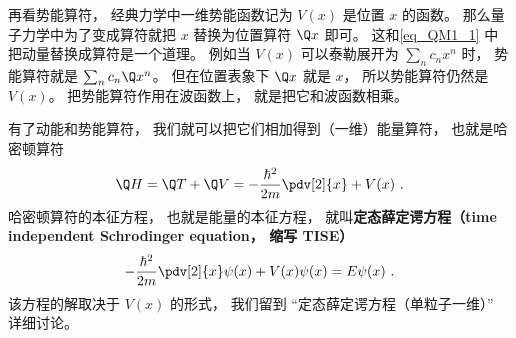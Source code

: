 再看势能算符， 经典力学中一维势能函数记为 $V(x)$ 是位置 $x$ 的函数。 那么量子力学中为了变成算符就把 $x$ 替换为位置算符 $\Q x$ 即可。 这和\autoref{eq_QM1_1} 中把动量替换成算符是一个道理。 例如当 $V(x)$ 可以泰勒展开为 $\sum_n c_n x^n$ 时， 势能算符就是 $\sum_n c_n \Q x^n$。 但在位置表象下 $\Q x$ 就是 $x$， 所以势能算符仍然是 $V(x)$。 把势能算符作用在波函数上， 就是把它和波函数相乘。

有了动能和势能算符， 我们就可以把它们相加得到（一维）能量算符， 也就是哈密顿算符
\begin{equation}
\Q H = \Q T + \Q V = -\frac{\hbar^2}{2m} \pdv[2]{x} + V(x)~.
\end{equation}
哈密顿算符的本征方程， 也就是能量的本征方程， 就叫\textbf{定态薛定谔方程（time independent Schrodinger equation， 缩写 TISE）}
\begin{equation}
-\frac{\hbar^2}{2m} \pdv[2]{x}\psi(x) + V(x)\psi(x) = E\psi(x)~.
\end{equation}
该方程的解取决于 $V(x)$ 的形式， 我们留到 “定态薛定谔方程（单粒子一维）” 详细讨论。
